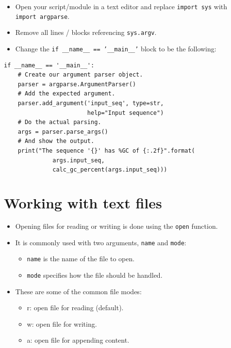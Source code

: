 \documentclass[aspectratio=1610,slidestop]{beamer}
\begin{document}
\begin{pframe}
 \vspace{-0.5cm}
 \begin{itemize}
  \item Open your script/module in a text editor and replace
  \texttt{import sys} with \texttt{import argparse}.
  \item Remove all lines / blocks referencing \texttt{sys.argv}.
  \item Change the \texttt{if __name__ == '__main__'} block to be
  the following:
 \end{itemize}
 \vspace{-0.3cm}
 \begin{pythoncode}
  \begin{verbatim}
if __name__ == '__main__':
    # Create our argument parser object.
    parser = argparse.ArgumentParser()
    # Add the expected argument.
    parser.add_argument('input_seq', type=str,
                        help="Input sequence")
    # Do the actual parsing.
    args = parser.parse_args()
    # And show the output.
    print("The sequence '{}' has %GC of {:.2f}".format(
              args.input_seq,
              calc_gc_percent(args.input_seq)))
   \end{verbatim}
 \end{pythoncode}
\end{pframe}



\section{Working with text files}

\begin{pframe}
 \begin{itemize}
  \item Opening files for reading or writing is done using the
  \texttt{open} function.
  \item It is commonly used with two arguments, \texttt{name} and \texttt{mode}:
  \begin{itemize}
   \item \texttt{name} is the name of the file to open.
   \item \texttt{mode} specifies how the file should be handled.
  \end{itemize}
  \item These are some of the common file modes:
  \begin{itemize}
   \item r: open file for reading (default).
   \item w: open file for writing.
   \item a: open file for appending content.
  \end{itemize}
 \end{itemize}
\end{pframe}
\end{document}
